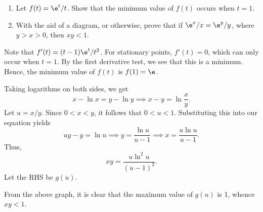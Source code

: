 \begin{problem}
    \begin{enumerate}
        \item Let $f(t) = \e^t /t$. Show that the minimum value of $f(t)$ occurs when $t = 1$.
        \item With the aid of a diagram, or otherwise, prove that if $\e^x / x = \e^y / y$, where $y > x > 0$, then $xy < 1$.
    \end{enumerate}
\end{problem}
\begin{solution}
    \begin{ppart}
        Note that $f'(t) = (t-1) \e^t / t^2$. For stationary points, $f'(t) = 0$, which can only occur when $t = 1$. By the first derivative test, we see that this is a minimum. Hence, the minimum value of $f(t)$ is $f(1) = \e$.
    \end{ppart}
    \begin{ppart}
        Taking logarithms on both sides, we get \[x - \ln x = y - \ln y \implies x - y = \ln \frac{x}{y}.\] Let $u = x/y$. Since $0 < x < y$, it follows that $0 < u < 1$. Substituting this into our equation yields \[uy - y = \ln u \implies y = \frac{\ln u}{u-1} \implies x = \frac{u \ln u}{u-1}.\] Thus, \[xy = \frac{u \ln^2 u}{(u-1)^2}.\] Let the RHS be $g(u)$.

        \begin{figure}[H]
        \centering
        \end{figure}

        From the above graph, it is clear that the maximum value of $g(u)$ is 1, whence $xy < 1$.
    \end{ppart}
\end{solution}

